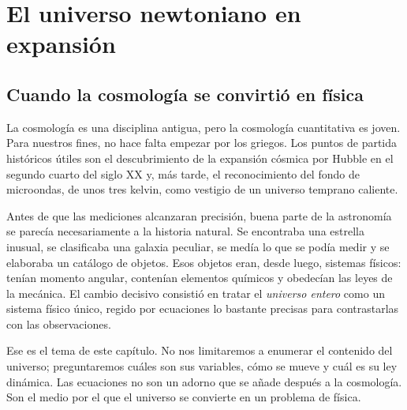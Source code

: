 \chapter{El universo newtoniano en expansión}


\section{Cuando la cosmología se convirtió en física}

La cosmología es una disciplina antigua, pero la cosmología cuantitativa es joven. Para nuestros fines, no hace falta empezar por los griegos. Los puntos de partida históricos útiles son el descubrimiento de la expansión cósmica por Hubble en el segundo cuarto del siglo XX y, más tarde, el reconocimiento del fondo de microondas, de unos tres kelvin, como vestigio de un universo temprano caliente.

Antes de que las mediciones alcanzaran precisión, buena parte de la astronomía se parecía necesariamente a la historia natural. Se encontraba una estrella inusual, se clasificaba una galaxia peculiar, se medía lo que se podía medir y se elaboraba un catálogo de objetos. Esos objetos eran, desde luego, sistemas físicos: tenían momento angular, contenían elementos químicos y obedecían las leyes de la mecánica. El cambio decisivo consistió en tratar el \emph{universo entero} como un sistema físico único, regido por ecuaciones lo bastante precisas para contrastarlas con las observaciones.

Ese es el tema de este capítulo. No nos limitaremos a enumerar el contenido del universo; preguntaremos cuáles son sus variables, cómo se mueve y cuál es su ley dinámica. Las ecuaciones no son un adorno que se añade después a la cosmología. Son el medio por el que el universo se convierte en un problema de física.

